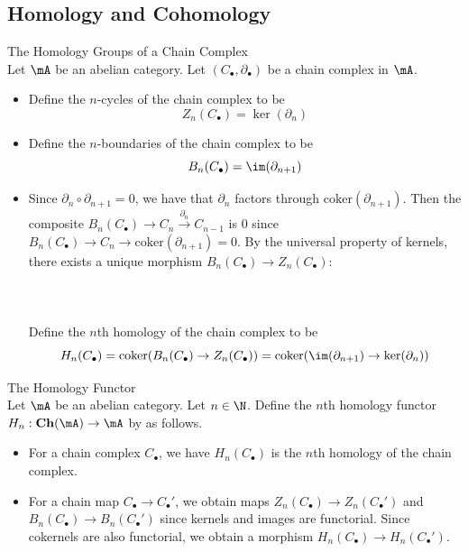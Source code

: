 \documentclass[a4paper]{article}
\begin{document}
\subsection{Homology and Cohomology}
\begin{defn}{The Homology Groups of a Chain Complex}{}\\
Let $\mA$ be an abelian category. Let $(C_\bullet,\partial_\bullet)$ be a chain complex in $\mA$. 
\begin{itemize}
\item Define the $n$-cycles of the chain complex to be $$Z_n(C_\bullet)=\ker(\partial_n)$$
\item Define the $n$-boundaries of the chain complex to be $$B_n(C_\bullet)=\im(\partial_{n+1})$$
\item Since $\partial_n\circ\partial_{n+1}=0$, we have that $\partial_n$ factors through $\text{coker}(\partial_{n+1})$. Then the composite $B_n(C_\bullet)\to C_n\overset{\partial_n}{\to} C_{n-1}$ is $0$ since $B_n(C_\bullet)\to C_n\to\text{coker}(\partial_{n+1})=0$. By the universal property of kernels, there exists a unique morphism $B_n(C_\bullet)\to Z_n(C_\bullet)$: \\~\\
\\~\\
Define the $n$th homology of the chain complex to be $$H_n(C_\bullet)=\text{coker}(B_n(C_\bullet)\to Z_n(C_\bullet))=\text{coker}(\im(\partial_{n+1})\to\ker(\partial_n))$$
\end{itemize}
\end{defn}

\begin{defn}{The Homology Functor}{}\\
Let $\mA$ be an abelian category. Let $n\in\N$. Define the $n$th homology functor $H_n:\bold{Ch}(\mA)\to\mA$ by as follows. 
\begin{itemize}
\item For a chain complex $C_\bullet$, we have $H_n(C_\bullet)$ is the $n$th homology of the chain complex. 
\item For a chain map $C_\bullet\to C_\bullet'$, we obtain maps $Z_n(C_\bullet)\to Z_n(C_\bullet')$ and $B_n(C_\bullet)\to B_n(C_\bullet')$ since kernels and images are functorial. Since cokernels are also functorial, we obtain a morphism $H_n(C_\bullet)\to H_n(C_\bullet')$. 
\end{itemize}
\end{defn}
\end{document}
